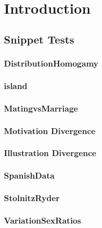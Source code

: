 \startthechapters 
 \chapter{Introduction}
 \label{chap:Intro}
 
 

 \section{Snippet Tests}
 
\subsection{DistributionHomogamy}
 
 
\subsection{island}
 
 
\subsection{MatingvsMarriage}
 
  
\subsection{Motivation Divergence} 
 
 
\subsection{Illustration Divergence} 
 
 
\subsection{SpanishData}
 

\subsection{StolnitzRyder}
 

\subsection{VariationSexRatios}
 
  

